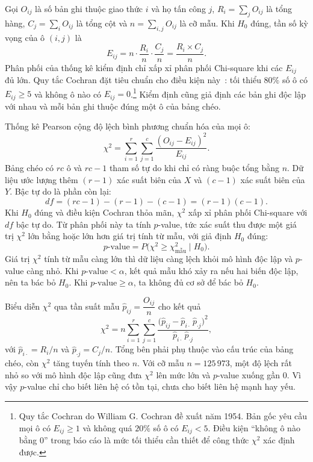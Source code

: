 \documentclass[../main.tex]{subfiles}
\begin{document}
Gọi $O_{ij}$ là số bản ghi thuộc giao thức $i$ và họ tấn công $j$, $R_i = \sum\limits_{j} O_{ij}$ là tổng hàng, $C_j = \sum\limits_{i} O_{ij}$ là tổng cột và $n = \sum\limits_{i,j} O_{ij}$ là cỡ mẫu. Khi $H_0$ đúng, tần số kỳ vọng của ô $(i, j)$ là
\begin{equation}
  \label{eq:t34:expected-frequency}
  E_{ij} = n \cdot \frac{R_i}{n} \cdot \frac{C_j}{n} = \frac{R_i \times C_j}{n}.
\end{equation}
Phân phối của thống kê kiểm định chỉ xấp xỉ phân phối Chi-square khi các $E_{ij}$ đủ lớn. Quy tắc Cochran đặt tiêu chuẩn cho điều kiện này~\cite{task34_cochran1954}: tối thiểu $80\%$ số ô có $E_{ij} \geq 5$ và không ô nào có $E_{ij} = 0$.\footnote{Quy tắc Cochran do William G. Cochran đề xuất năm 1954. Bản gốc yêu cầu mọi ô có $E_{ij} \geq 1$ và không quá $20\%$ số ô có $E_{ij} < 5$. Điều kiện ``không ô nào bằng $0$'' trong báo cáo là mức tối thiểu cần thiết để công thức $\chi^2$ xác định được.} Kiểm định cũng giả định các bản ghi độc lập với nhau và mỗi bản ghi thuộc đúng một ô của bảng chéo.

Thống kê Pearson cộng độ lệch bình phương chuẩn hóa của mọi ô:
\begin{equation}
  \label{eq:t34:chi-square-statistic}
  \chi^2 = \sum_{i=1}^{r} \sum_{j=1}^{c} \frac{(O_{ij} - E_{ij})^2}{E_{ij}}.
\end{equation}
Bảng chéo có $rc$ ô và $rc - 1$ tham số tự do khi chỉ có ràng buộc tổng bằng $n$. Dữ liệu ước lượng thêm $(r - 1)$ xác suất biên của $X$ và $(c - 1)$ xác suất biên của $Y$. Bậc tự do là phần còn lại:
\begin{equation}
  \label{eq:t34:degrees-of-freedom}
  df = (rc - 1) - (r - 1) - (c - 1) = (r - 1)(c - 1).
\end{equation}
Khi $H_0$ đúng và điều kiện Cochran thỏa mãn, $\chi^2$ xấp xỉ phân phối Chi-square với $df$ bậc tự do. Từ phân phối này ta tính $p$-value, tức xác suất thu được một giá trị $\chi^2$ lớn bằng hoặc lớn hơn giá trị tính từ mẫu, với giả định $H_0$ đúng:
\begin{equation}
  \label{eq:t34:p-value}
  p\text{-value} = P\bigl(\chi^2 \geq \chi^2_{\text{mẫu}} \mid H_0\bigr).
\end{equation}
Giá trị $\chi^2$ tính từ mẫu càng lớn thì dữ liệu càng lệch khỏi mô hình độc lập và $p$-value càng nhỏ. Khi $p\text{-value} < \alpha$, kết quả mẫu khó xảy ra nếu hai biến độc lập, nên ta bác bỏ $H_0$. Khi $p\text{-value} \geq \alpha$, ta không đủ cơ sở để bác bỏ $H_0$.

Biểu diễn $\chi^2$ qua tần suất mẫu $\hat{p}_{ij} = \dfrac{O_{ij}}{n}$ cho kết quả
\begin{equation}
  \label{eq:t34:chi-square-proportions}
  \chi^2 = n \sum_{i=1}^{r} \sum_{j=1}^{c} \frac{\bigl(\hat{p}_{ij} - \hat{p}_{i\cdot}\,\hat{p}_{\cdot j}\bigr)^2}{\hat{p}_{i\cdot}\,\hat{p}_{\cdot j}},
\end{equation}
với $\hat{p}_{i\cdot} = R_i/n$ và $\hat{p}_{\cdot j} = C_j/n$. Tổng bên phải phụ thuộc vào cấu trúc của bảng chéo, còn $\chi^2$ tăng tuyến tính theo $n$. Với cỡ mẫu $n = 125\,973$, một độ lệch rất nhỏ so với mô hình độc lập cũng đưa $\chi^2$ lên mức lớn và $p$-value xuống gần $0$. Vì vậy $p$-value chỉ cho biết liên hệ có tồn tại, chưa cho biết liên hệ mạnh hay yếu.
\end{document}
